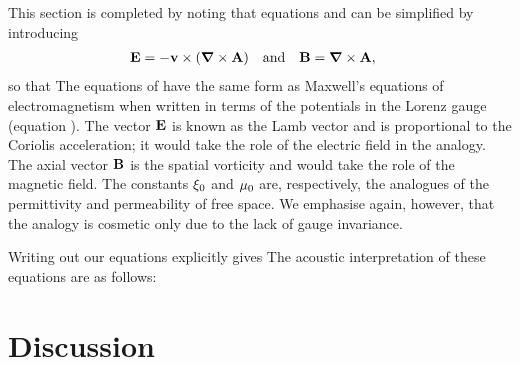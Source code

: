This section is completed by noting that equations  and  can be simplified by introducing
\begin{align}
  \mathbf{E} &= - \textbf{v} \times \left(  \mbox{\boldmath $\nabla$} \times \textbf{A} \right) &\text{and}&&
  \mathbf{B} &= \mbox{\boldmath $\nabla$} \times \textbf{A},
\end{align}
so that
The equations of  have the same form as  Maxwell's equations of electromagnetism when written in terms of the potentials in the Lorenz gauge\cite{Doran2003}
(equation ).
The vector $\mathbf{E}$ is known as the Lamb vector and is proportional to the Coriolis acceleration;
 it would take the role of the electric field in the analogy.
The axial vector $\mathbf{B}$ is the spatial vorticity and would take the role of the magnetic field.
The constants $\xi_0$ and $\mu_0$ are, respectively, the analogues of the permittivity and permeability of free space.
We emphasise again, however, that the analogy is cosmetic only due to the lack of gauge invariance.

Writing out our equations explicitly gives
The acoustic interpretation of these equations are as follows:



\section{Discussion}\label{sec:discussion}



